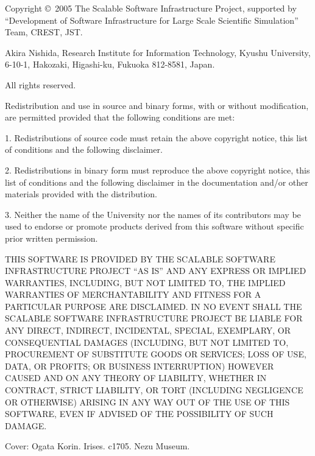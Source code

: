 \documentclass[a4paper]{article}
\begin{document}
\newpage
\begin{flushleft}
{\small
Copyright \copyright\ 2005 The Scalable Software Infrastructure Project,
supported by ``Development of Software Infrastructure for Large Scale
Scientific Simulation'' Team, CREST, JST.

Akira Nishida, Research Institute for Information Technology, 
Kyushu University, 6-10-1, Hakozaki, Higashi-ku, Fukuoka 812-8581, Japan.

All rights reserved.

\vspace*{5mm}
 Redistribution and use in source and binary forms, with or without
 modification, are permitted provided that the following conditions are
 met:

 1. Redistributions of source code must retain the above copyright
 notice, this list of conditions and the following disclaimer.

 2. Redistributions in binary form must reproduce the above copyright
 notice, this list of conditions and the following disclaimer in the
 documentation and/or other materials provided with the distribution.

 3. Neither the name of the University nor the names of its contributors
 may be used to endorse or promote products derived from this software
 without specific prior written permission.

\vspace*{5mm}
 THIS SOFTWARE IS PROVIDED BY THE SCALABLE SOFTWARE INFRASTRUCTURE
 PROJECT ``AS IS'' AND ANY EXPRESS OR IMPLIED WARRANTIES, INCLUDING, BUT
 NOT LIMITED TO, THE IMPLIED WARRANTIES OF MERCHANTABILITY AND FITNESS
 FOR A PARTICULAR PURPOSE ARE DISCLAIMED. IN NO EVENT SHALL THE SCALABLE
 SOFTWARE INFRASTRUCTURE PROJECT BE LIABLE FOR ANY DIRECT, INDIRECT,
 INCIDENTAL, SPECIAL, EXEMPLARY, OR CONSEQUENTIAL DAMAGES (INCLUDING,
 BUT NOT LIMITED TO, PROCUREMENT OF SUBSTITUTE GOODS OR SERVICES; LOSS
 OF USE, DATA, OR PROFITS; OR BUSINESS INTERRUPTION) HOWEVER CAUSED AND
 ON ANY THEORY OF LIABILITY, WHETHER IN CONTRACT, STRICT LIABILITY, OR
 TORT (INCLUDING NEGLIGENCE OR OTHERWISE) ARISING IN ANY WAY OUT OF THE
 USE OF THIS SOFTWARE, EVEN IF ADVISED OF THE POSSIBILITY OF SUCH
 DAMAGE.

\vfill
Cover: Ogata Korin. Irises. c1705. Nezu Museum.
}
\end{flushleft}
\thispagestyle{empty}

\newpage
{}
\tableofcontents

\setcounter{section}{0}
\end{document}
